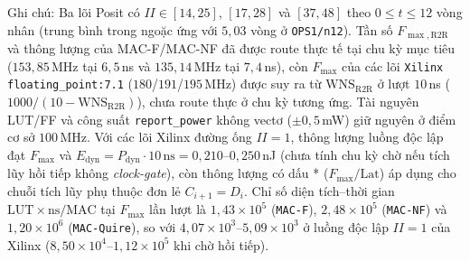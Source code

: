\begin{table}[!htbp]
  {\footnotesize Ghi chú: Ba lõi Posit có $II \in [14,25]$, $[17,28]$ và $[37,48]$ theo $0 \le t \le 12$ vòng nhân (trung bình trong ngoặc ứng với $5{,}03$ vòng ở \texttt{OPS1/n12}). Tần số $F_{\max,\mathrm{R2R}}$ và thông lượng của MAC-F/MAC-NF đã được route thực tế tại chu kỳ mục tiêu ($153{,}85$\,MHz tại $6{,}5$\,ns và $135{,}14$\,MHz tại $7{,}4$\,ns), còn $F_{\max}$ của các lõi \texttt{Xilinx floating\_point:7.1} ($180$/$191$/$195$\,MHz) được suy ra từ $\mathrm{WNS}_{\mathrm{R2R}}$ ở lượt $10$\,ns ($1000/(10-\mathrm{WNS}_{\mathrm{R2R}})$), chưa route thực ở chu kỳ tương ứng. Tài nguyên LUT/FF và công suất \texttt{report\_power} không vectơ ($\pm 0{,}5$\,mW) giữ nguyên ở điểm cơ sở $100$\,MHz. Với các lõi Xilinx đường ống $II=1$, thông lượng luồng độc lập đạt $F_{\max}$ và $E_{\mathrm{dyn}} = P_{\mathrm{dyn}}\cdot 10\,\text{ns} = 0{,}210\text{--}0{,}250$\,nJ (chưa tính chu kỳ chờ nếu tích lũy hồi tiếp không \textit{clock-gate}), còn thông lượng có dấu * ($F_{\max}/\mathrm{Lat}$) áp dụng cho chuỗi tích lũy phụ thuộc đơn lẻ $C_{i+1}=D_i$. Chỉ số diện tích--thời gian $\mathrm{LUT}\times\mathrm{ns}/\mathrm{MAC}$ tại $F_{\max}$ lần lượt là $1{,}43{\times}10^5$ (\texttt{MAC-F}), $2{,}48{\times}10^5$ (\texttt{MAC-NF}) và $1{,}20{\times}10^6$ (\texttt{MAC-Quire}), so với $4{,}07{\times}10^3\text{--}5{,}09{\times}10^3$ ở luồng độc lập $II=1$ của Xilinx ($8{,}50{\times}10^4\text{--}1{,}12{\times}10^5$ khi chờ hồi tiếp).}
\end{table}
